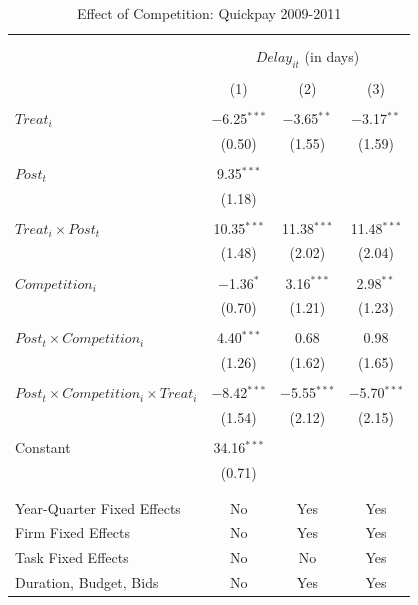 \documentclass[
]{article}
\begin{document}
\begin{table}[H] \centering 
  \caption{Effect of Competition: Quickpay 2009-2011} 
  \label{} 
\small 
\begin{tabular}{@{\extracolsep{-2pt}}lccc} 
\\[-1.8ex]\hline 
\hline \\[-1.8ex] 
\\[-1.8ex] & \multicolumn{3}{c}{$Delay_{it}$ (in days)} \\ 
\\[-1.8ex] & (1) & (2) & (3)\\ 
\hline \\[-1.8ex] 
 $Treat_i$ & $-$6.25$^{***}$ & $-$3.65$^{**}$ & $-$3.17$^{**}$ \\ 
  & (0.50) & (1.55) & (1.59) \\ 
  & & & \\ 
 $Post_t$ & 9.35$^{***}$ &  &  \\ 
  & (1.18) &  &  \\ 
  & & & \\ 
 $Treat_i \times Post_t$ & 10.35$^{***}$ & 11.38$^{***}$ & 11.48$^{***}$ \\ 
  & (1.48) & (2.02) & (2.04) \\ 
  & & & \\ 
 $Competition_i$ & $-$1.36$^{*}$ & 3.16$^{***}$ & 2.98$^{**}$ \\ 
  & (0.70) & (1.21) & (1.23) \\ 
  & & & \\ 
 $Post_t \times Competition_i$ & 4.40$^{***}$ & 0.68 & 0.98 \\ 
  & (1.26) & (1.62) & (1.65) \\ 
  & & & \\ 
 $Post_t \times Competition_i \times Treat_i$ & $-$8.42$^{***}$ & $-$5.55$^{***}$ & $-$5.70$^{***}$ \\ 
  & (1.54) & (2.12) & (2.15) \\ 
  & & & \\ 
 Constant & 34.16$^{***}$ &  &  \\ 
  & (0.71) &  &  \\ 
  & & & \\ 
\hline \\[-1.8ex] 
Year-Quarter Fixed Effects & No & Yes & Yes \\ 
Firm Fixed Effects & No & Yes & Yes \\ 
Task Fixed Effects & No & No & Yes \\ 
Duration, Budget, Bids & No & Yes & Yes \\ 

\end{tabular}
\end{table}
\end{document}
